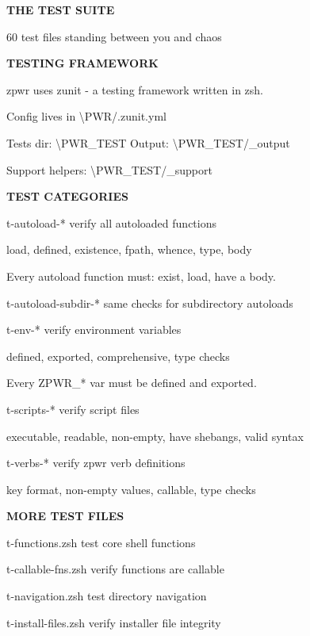 \documentclass[11pt,a4paper,twoside]{book}
\begin{document}
\vspace{10pt}
{\large\bfseries\color{neoncyan} THE TEST SUITE}\vspace{6pt}

60 test files standing between you and chaos


\vspace{12pt}
{\bfseries\color{neonyellow} TESTING FRAMEWORK}\vspace{4pt}

zpwr uses zunit - a testing framework written in zsh.

Config lives in \textbackslash{}PWR/.zunit.yml

Tests dir: \textbackslash{}PWR\_TEST  Output: \textbackslash{}PWR\_TEST/\_output

Support helpers: \textbackslash{}PWR\_TEST/\_support


\vspace{12pt}
{\bfseries\color{neonyellow} TEST CATEGORIES}\vspace{4pt}

t-autoload-*       verify all autoloaded functions

load, defined, existence, fpath, whence, type, body

Every autoload function must: exist, load, have a body.

t-autoload-subdir-* same checks for subdirectory autoloads

t-env-*            verify environment variables

defined, exported, comprehensive, type checks

Every ZPWR\_* var must be defined and exported.

t-scripts-*        verify script files

executable, readable, non-empty, have shebangs, valid syntax

t-verbs-*          verify zpwr verb definitions

key format, non-empty values, callable, type checks


\vspace{12pt}
{\bfseries\color{neonyellow} MORE TEST FILES}\vspace{4pt}

t-functions.zsh     test core shell functions

t-callable-fns.zsh  verify functions are callable

t-navigation.zsh    test directory navigation

t-install-files.zsh verify installer file integrity
\end{document}
